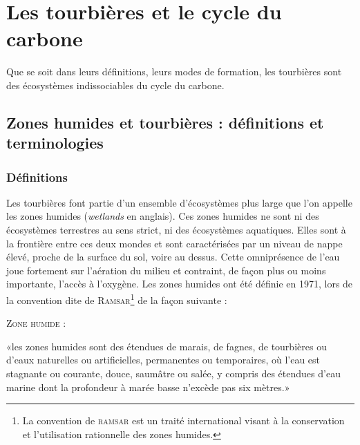 \section{Les tourbières et le cycle du carbone}

Que se soit dans leurs définitions, leurs modes de formation, les tourbières sont des écosystèmes indissociables du cycle du carbone.

\subsection{Zones humides et tourbières : définitions et terminologies}

\subsubsection{Définitions}

Les tourbières font partie d'un ensemble d'écosystèmes plus large que l'on appelle les zones humides (\textit{wetlands} en anglais).
Ces zones humides ne sont ni des écosystèmes terrestres au sens strict, ni des écosystèmes aquatiques.
Elles sont à la frontière entre ces deux mondes et sont caractérisées par un niveau de nappe élevé, proche de la surface du sol, voire au dessus.
Cette omniprésence de l'eau joue fortement sur l'aération du milieu et contraint, de façon plus ou moins importante, l'accès à l'oxygène.
Les zones humides ont été définie en 1971, lors de la convention dite de \textsc{Ramsar}\footnote{La convention de \textsc{ramsar} est un traité international visant à la conservation et l’utilisation rationnelle des zones humides.} de la façon suivante : 
\begin{pdef}
\textsc{Zone humide} :

«les zones humides sont des étendues de marais, de fagnes\footnotemark, de tourbières ou d'eaux naturelles ou artificielles, permanentes ou temporaires, où l'eau est stagnante ou courante, douce, saumâtre ou salée, y compris des étendues d'eau marine dont la profondeur à marée basse n'excède pas six mètres.»

\hfill {\scriptsize \citep{ramsar1987}}
\end{pdef}

